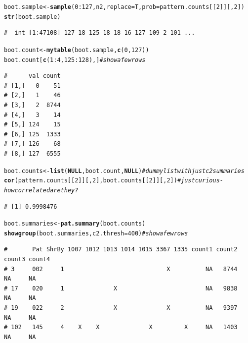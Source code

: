 \documentclass{article}\usepackage[]{graphicx}\usepackage[]{color}
\makeatletter
\newcommand{\hlnum}[1]{\textcolor[rgb]{0.686,0.059,0.569}{#1}}%
\newcommand{\hlcom}[1]{\textcolor[rgb]{0.678,0.584,0.686}{\textit{#1}}}%
\newcommand{\hlopt}[1]{\textcolor[rgb]{0,0,0}{#1}}%
\newcommand{\hlstd}[1]{\textcolor[rgb]{0.345,0.345,0.345}{#1}}%
\newcommand{\hlkwa}[1]{\textcolor[rgb]{0.161,0.373,0.58}{\textbf{#1}}}%
\newcommand{\hlkwb}[1]{\textcolor[rgb]{0.69,0.353,0.396}{#1}}%
\newcommand{\hlkwc}[1]{\textcolor[rgb]{0.333,0.667,0.333}{#1}}%
\newcommand{\hlkwd}[1]{\textcolor[rgb]{0.737,0.353,0.396}{\textbf{#1}}}%
\newenvironment{kframe}{%
 \def\at@end@of@kframe{}%
 \ifinner\ifhmode%
  \def\at@end@of@kframe{\end{minipage}}%
  \begin{minipage}{\columnwidth}%
 \fi\fi%
 \def\FrameCommand##1{\hskip\@totalleftmargin \hskip-\fboxsep
 \colorbox{shadecolor}{##1}\hskip-\fboxsep
     \hskip-\linewidth \hskip-\@totalleftmargin \hskip\columnwidth}%
 \MakeFramed {\advance\hsize-\width
   \@totalleftmargin\z@ \linewidth\hsize
   \@setminipage}}%
 {\par\unskip\endMakeFramed%
 \at@end@of@kframe}
\newenvironment{knitrout}{}{} %
\makeatother
\begin{document}
\begin{knitrout}\footnotesize
{}\color{fgcolor}\begin{kframe}
\begin{alltt}
\hlstd{boot.sample} \hlkwb{<-} \hlkwd{sample}\hlstd{(}\hlnum{0}\hlopt{:}\hlnum{127}\hlstd{,n2,}\hlkwc{replace}\hlstd{=T,}\hlkwc{prob}\hlstd{=pattern.counts[[}\hlnum{2}\hlstd{]][,}\hlnum{2}\hlstd{])}
\hlkwd{str}\hlstd{(boot.sample)}
\end{alltt}
\begin{verbatim}
#  int [1:47108] 127 18 125 18 18 16 127 109 2 101 ...
\end{verbatim}
\begin{alltt}
\hlstd{boot.count} \hlkwb{<-} \hlkwd{mytable}\hlstd{(boot.sample,}\hlkwd{c}\hlstd{(}\hlnum{0}\hlstd{,}\hlnum{127}\hlstd{))}
\hlstd{boot.count[}\hlkwd{c}\hlstd{(}\hlnum{1}\hlopt{:}\hlnum{4}\hlstd{,}\hlnum{125}\hlopt{:}\hlnum{128}\hlstd{),]} \hlcom{# show a few rows}
\end{alltt}
\begin{verbatim}
#      val count
# [1,]   0    51
# [2,]   1    46
# [3,]   2  8744
# [4,]   3    14
# [5,] 124    15
# [6,] 125  1333
# [7,] 126    68
# [8,] 127  6555
\end{verbatim}
\begin{alltt}
\hlstd{boot.counts} \hlkwb{<-} \hlkwd{list}\hlstd{(}\hlkwa{NULL}\hlstd{,boot.count,}\hlkwa{NULL}\hlstd{)} \hlcom{# dummy list with just c2 summaries}
\hlkwd{cor}\hlstd{(pattern.counts[[}\hlnum{2}\hlstd{]][,}\hlnum{2}\hlstd{],boot.counts[[}\hlnum{2}\hlstd{]][,}\hlnum{2}\hlstd{])} \hlcom{# just curious - how correlated are they?}
\end{alltt}
\begin{verbatim}
# [1] 0.9998476
\end{verbatim}
\begin{alltt}
\hlstd{boot.summaries} \hlkwb{<-} \hlkwd{pat.summary}\hlstd{(boot.counts)}
\hlkwd{showgroup}\hlstd{(boot.summaries,}\hlkwc{c2.thresh}\hlstd{=}\hlnum{400}\hlstd{)} \hlcom{#show a few rows}
\end{alltt}
\begin{verbatim}
#       Pat ShrBy 1007 1012 1013 1014 1015 3367 1335 count1 count2 count3 count4
# 3     002     1                             X          NA   8744     NA     NA
# 17    020     1              X                         NA   9838     NA     NA
# 19    022     2              X              X          NA   9397     NA     NA
# 102   145     4    X    X              X         X     NA   1403     NA     NA

\end{verbatim}
\end{kframe}
\end{knitrout}
\end{document}
